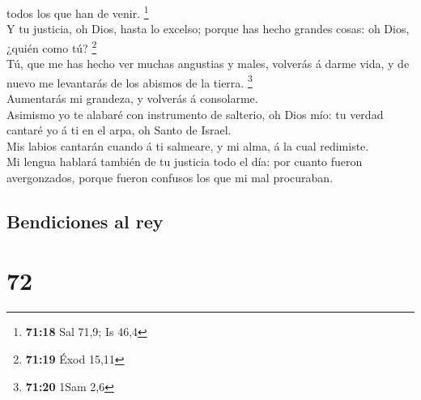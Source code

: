 todos los que han de venir. \footnote{\textbf{71:18} Sal 71,9; Is 46,4}\\
 Y tu justicia, oh Dios, hasta lo excelso; porque has
hecho grandes cosas: oh Dios, ¿quién como tú? \footnote{\textbf{71:19}
  Éxod 15,11}\\
 Tú, que me has hecho ver muchas angustias y males,
volverás á darme vida, y de nuevo me levantarás de los abismos de la
tierra. \footnote{\textbf{71:20} 1Sam 2,6}\\
 Aumentarás mi grandeza, y volverás á consolarme.\\
 Asimismo yo te alabaré con instrumento de salterio, oh
Dios mío: tu verdad cantaré yo á ti en el arpa, oh Santo de Israel.\\
 Mis labios cantarán cuando á ti salmeare, y mi alma, á
la cual redimiste.\\
 Mi lengua hablará también de tu justicia todo el día:
por cuanto fueron avergonzados, porque fueron confusos los que mi mal
procuraban.

\hypertarget{bendiciones-al-rey}{%
\subsection{Bendiciones al rey}\label{bendiciones-al-rey}}

\hypertarget{section-71}{%
\section{72}\label{section-71}}

